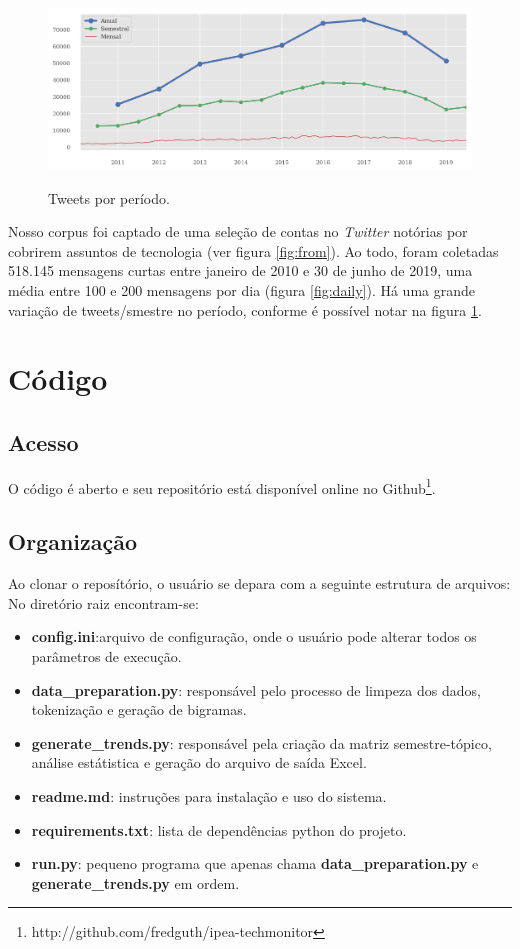 \documentclass[paper=a4, fontsize=11pt]{scrartcl}
\numberwithin{equation}{section}		%
\numberwithin{figure}{section}			%
\numberwithin{table}{section}				%
\begin{document}
\begin{figure}[!h]
	\centering
	\caption{Tweets por período.}
	\includegraphics[width=.8\columnwidth]{anual-semestral}
	\label{fig:volume-tweets}
\end{figure}
Nosso corpus foi captado de uma seleção de contas no \emph{Twitter} notórias por cobrirem assuntos de tecnologia (ver figura \ref{fig:from}). Ao todo, foram coletadas 518.145 mensagens curtas entre janeiro de 2010 e 30 de junho de 2019, uma média entre 100 e 200 mensagens por dia (figura \ref{fig:daily}).
Há uma grande variação de tweets/smestre no período, conforme é possível notar na figura \ref{fig:volume-tweets}.
\section{Código}
\subsection{Acesso}
O código é aberto e seu repositório está disponível online no Github\footnote{http://github.com/fredguth/ipea-techmonitor}.
\subsection{Organização}
Ao clonar o reposítório, o usuário se depara com a seguinte estrutura de arquivos:
\vspace{.7cm}
No diretório raiz encontram-se:
\begin{itemize}
	\item \textbf{config.ini}:arquivo de configuração, onde o usuário pode alterar todos os parâmetros de execução.
	\item \textbf{data\_preparation.py}: responsável pelo processo de limpeza dos dados, tokenização e geração de bigramas.
	\item \textbf{generate\_trends.py}: responsável pela criação da matriz semestre-tópico, análise estátistica e geração do arquivo de saída Excel.
	\item \textbf{readme.md}: instruções para instalação e uso do sistema.
	\item \textbf{requirements.txt}: lista de dependências python do projeto. 
	\item \textbf{run.py}: pequeno programa que apenas chama \textbf{data\_preparation.py} e \textbf{generate\_trends.py} em ordem.
\end{itemize}	
\end{document}
